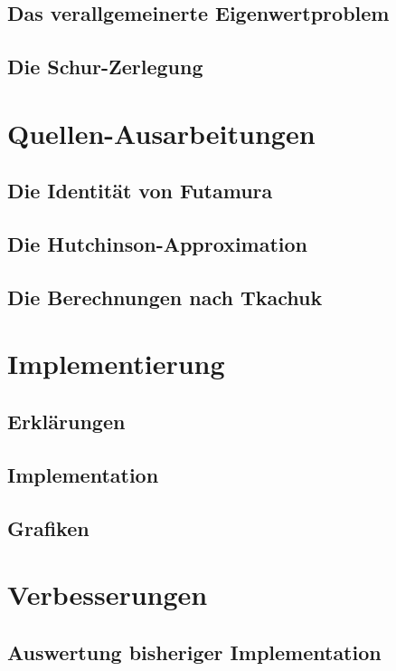 \documentclass[ngerman,BCOR=4mm]{tudscrreprt}
\theoremstyle{plain} %
\theoremstyle{definition} %
\theoremstyle{remark}
\begin{document}
      \section{Das verallgemeinerte Eigenwertproblem}

      \section{Die Schur-Zerlegung}

\chapter{Quellen-Ausarbeitungen}
\label{sec: Quellen}
      \section{Die Identität von Futamura}

      \section{Die Hutchinson-Approximation}

      \section{Die Berechnungen nach Tkachuk}

\chapter{Implementierung}
\label{sec: Programmieren}
      \section{Erklärungen}

      \section{Implementation}

      \section{Grafiken}

\chapter{Verbesserungen}
\label{sec: Verbesserungen}
      \section{Auswertung bisheriger Implementation}
\end{document}
